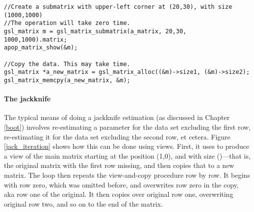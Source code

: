 \begin{lstlisting}
//Create a submatrix with upper-left corner at (20,30), with size (1000,1000)
//The operation will take zero time.
gsl_matrix m = gsl_matrix_submatrix(a_matrix, 20,30, 1000,1000).matrix;
apop_matrix_show(&m);

//Copy the data. This may take time.
gsl_matrix *a_new_matrix = gsl_matrix_alloc((&m)->size1, (&m)->size2);
gsl_matrix_memcpy(a_new_matrix, &m);
\end{lstlisting}

\paragraph{The jackknife}
The typical means of doing a jackknife estimation (as discussed in
Chapter \ref{boot}) involves re-estimating a parameter for the data set
excluding the first row, re-estimating it for the data set excluding the
second row, et cetera.  Figure \ref{jack_iteration}
shows how this can be done using views.  First, it uses
 to produce a view of the main matrix
starting at the position (1,0), and with size ()---that is, the original matrix with the first row missing,
and then copies that to a new matrix. The  loop then repeats
the view-and-copy procedure row by row.  It begins with row zero, which
was omitted before, and overwrites row zero in the copy, aka row one of
the original. It then copies over original row one, overwriting original
row two, and so on to the end of the matrix.



